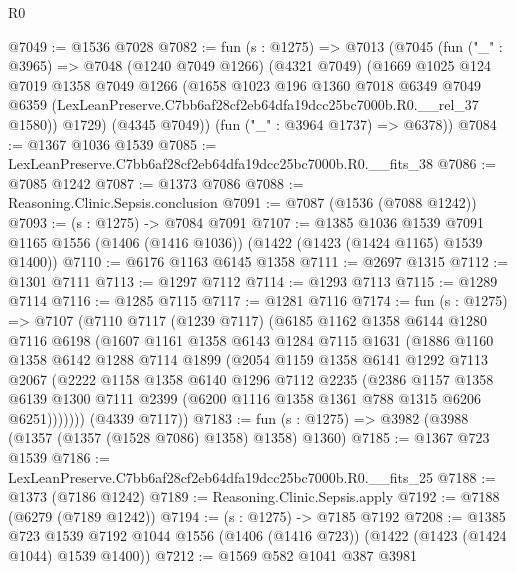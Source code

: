 \begin{lexlean}{R0}
\begin{coremodule}
@7049 := @1536 @7028
@7082 := fun (s : @1275) =>
  @7013
    (@7045
      (fun ("_" : @3965) =>
      @7048
        (@1240 @7049 @1266)
        (@4321 @7049)
        (@1669
          @1025
          @124
          @7019
          @1358
          @7049
          @1266
          (@1658
            @1023
            @196
            @1360
            @7018
            @6349
            @7049
            @6359
            (LexLeanPreserve.C7bb6af28cf2eb64dfa19dcc25bc7000b.R0.__rel_37 @1580))
          @1729)
        (@4345 @7049))
      (fun ("_" : @3964 @1737) => @6378))
@7084 := @1367 @1036 @1539
@7085 := LexLeanPreserve.C7bb6af28cf2eb64dfa19dcc25bc7000b.R0.__fits_38
@7086 := @7085 @1242
@7087 := @1373 @7086
@7088 := Reasoning.Clinic.Sepsis.conclusion
@7091 := @7087 (@1536 (@7088 @1242))
@7093 := (s : @1275) -> @7084 @7091
@7107 := @1385
    @1036
    @1539
    @7091
    @1165
    @1556
    (@1406 (@1416 @1036))
    (@1422 (@1423 (@1424 @1165) @1539 @1400))
@7110 := @6176 @1163 @6145 @1358
@7111 := @2697 @1315
@7112 := @1301 @7111
@7113 := @1297 @7112
@7114 := @1293 @7113
@7115 := @1289 @7114
@7116 := @1285 @7115
@7117 := @1281 @7116
@7174 := fun (s : @1275) =>
  @7107
    (@7110
      @7117
      (@1239 @7117)
      (@6185
        @1162
        @1358
        @6144
        @1280
        @7116
        @6198
        (@1607
          @1161
          @1358
          @6143
          @1284
          @7115
          @1631
          (@1886
            @1160
            @1358
            @6142
            @1288
            @7114
            @1899
            (@2054
              @1159
              @1358
              @6141
              @1292
              @7113
              @2067
              (@2222
                @1158
                @1358
                @6140
                @1296
                @7112
                @2235
                (@2386
                  @1157
                  @1358
                  @6139
                  @1300
                  @7111
                  @2399
                  (@6200 @1116 @1358 @1361 @788 @1315 @6206 @6251)))))))
      (@4339 @7117))
@7183 := fun (s : @1275) => @3982 (@3988 (@1357 (@1357 (@1528 @7086) @1358) @1358) @1360)
@7185 := @1367 @723 @1539
@7186 := LexLeanPreserve.C7bb6af28cf2eb64dfa19dcc25bc7000b.R0.__fits_25
@7188 := @1373 (@7186 @1242)
@7189 := Reasoning.Clinic.Sepsis.apply
@7192 := @7188 (@6279 (@7189 @1242))
@7194 := (s : @1275) -> @7185 @7192
@7208 := @1385
    @723
    @1539
    @7192
    @1044
    @1556
    (@1406 (@1416 @723))
    (@1422 (@1423 (@1424 @1044) @1539 @1400))
@7212 := @1569 @582 @1041 @387 @3981

\end{coremodule}
\end{lexlean}
